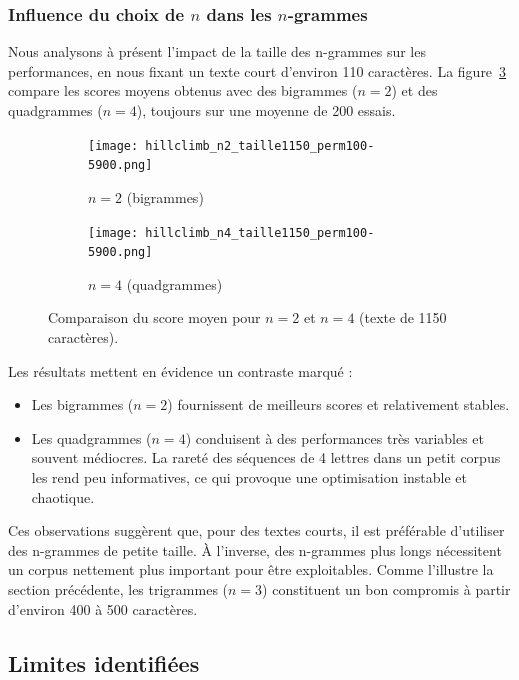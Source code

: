 \documentclass[a4paper]{article}
\begin{document}
\subsubsection{Influence du choix de $n$ dans les $n$-grammes}

Nous analysons à présent l’impact de la taille des n-grammes sur les performances, en nous fixant un texte court d’environ 110 caractères. La figure~\ref{fig:ngrams-1150} compare les scores moyens obtenus avec des bigrammes ($n=2$) et des quadgrammes ($n=4$), toujours sur une moyenne de 200 essais.


\begin{figure}[H]
    \centering
    \begin{subfigure}[b]{0.45\textwidth}
        \texttt{[image: hillclimb\_n2\_taille1150\_perm100-5900.png]}
        \caption{$n = 2$ (bigrammes)}
        \label{fig:n2-110}
    \end{subfigure}
    \hfill
    \begin{subfigure}[b]{0.45\textwidth}
        \texttt{[image: hillclimb\_n4\_taille1150\_perm100-5900.png]}
        \caption{$n = 4$ (quadgrammes)}
        \label{fig:n4-110}
    \end{subfigure}
    \caption{Comparaison du score moyen pour $n = 2$ et $n = 4$ (texte de 1150 caractères).}
    \label{fig:ngrams-1150}
\end{figure}
Les résultats mettent en évidence un contraste marqué :

\begin{itemize}
    \item Les bigrammes ($n=2$) fournissent de meilleurs scores et relativement stables.
    \item Les quadgrammes ($n=4$) conduisent à des performances très variables et souvent médiocres. La rareté des séquences de 4 lettres dans un petit corpus les rend peu informatives, ce qui provoque une optimisation instable et chaotique.
\end{itemize}

Ces observations suggèrent que, pour des textes courts, il est préférable d’utiliser des n-grammes de petite taille. À l’inverse, des n-grammes plus longs nécessitent un corpus nettement plus important pour être exploitables. Comme l’illustre la section précédente, les trigrammes ($n=3$) constituent un bon compromis à partir d’environ 400 à 500 caractères.



\subsection{Limites identifiées}
\end{document}
